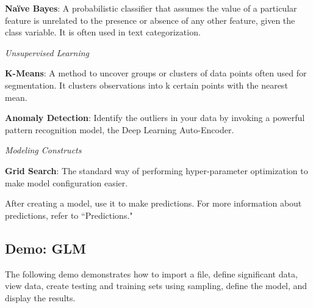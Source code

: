 {\textbf{Na\"{i}ve Bayes}}: A probabilistic classifier that assumes the value of a particular feature is unrelated to the presence or absence of any other feature, given the class variable. It is often used in text categorization.

{\textit{Unsupervised Learning}}

{\textbf{K-Means}}: A method to uncover groups or clusters of data points often used for segmentation. It clusters observations into k certain points with the nearest mean.

{\textbf{Anomaly Detection}}: Identify the outliers in your data by invoking a powerful pattern recognition model, the Deep Learning Auto-Encoder.

{\textit{Modeling Constructs}}

{\textbf{Grid Search}}: The standard way of performing hyper-parameter optimization to make model configuration easier. %

After creating a model, use it to make predictions. For more information about predictions, refer to ``Predictions." 

\subsection{Demo: GLM}

The following demo demonstrates how to import a file, define significant data, view data, create testing and training sets using sampling, define the model, and display the results.

